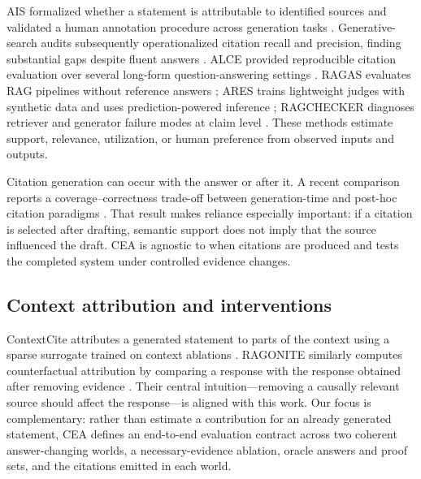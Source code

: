 \documentclass[10pt,twocolumn]{article}
\newcommand{\method}{\textsc{CEA}}
\begin{document}
AIS formalized whether a statement is attributable to identified sources and validated a human annotation procedure across generation tasks \citep{rashkin2021ais}. Generative-search audits subsequently operationalized citation recall and precision, finding substantial gaps despite fluent answers \citep{liu2023verifiability}. ALCE provided reproducible citation evaluation over several long-form question-answering settings \citep{gao2023alce}. RAGAS evaluates RAG pipelines without reference answers \citep{es2023ragas}; ARES trains lightweight judges with synthetic data and uses prediction-powered inference \citep{saadfalcon2023ares}; RAGCHECKER diagnoses retriever and generator failure modes at claim level \citep{ru2024ragchecker}. These methods estimate support, relevance, utilization, or human preference from observed inputs and outputs.

Citation generation can occur with the answer or after it. A recent comparison reports a coverage--correctness trade-off between generation-time and post-hoc citation paradigms \citep{saxena2025citation}. That result makes reliance especially important: if a citation is selected after drafting, semantic support does not imply that the source influenced the draft. \method{} is agnostic to when citations are produced and tests the completed system under controlled evidence changes.

\subsection{Context attribution and interventions}

ContextCite attributes a generated statement to parts of the context using a sparse surrogate trained on context ablations \citep{cohenwang2024contextcite}. RAGONITE similarly computes counterfactual attribution by comparing a response with the response obtained after removing evidence \citep{saharoy2024ragonite}. Their central intuition---removing a causally relevant source should affect the response---is aligned with this work. Our focus is complementary: rather than estimate a contribution for an already generated statement, \method{} defines an end-to-end evaluation contract across two coherent answer-changing worlds, a necessary-evidence ablation, oracle answers and proof sets, and the citations emitted in each world.
\end{document}
